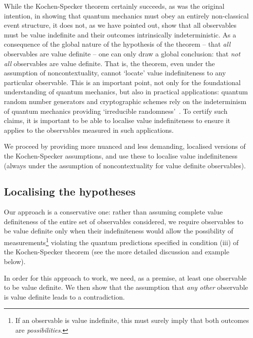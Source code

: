 \documentclass[%
 superscriptaddress,
 preprint,
 showpacs,
 showkeys,
 nofootinbib,
  amsmath,amssymb,
  aps,
  longbibliography,
  floatfix,
 ]{revtex4-1}
\theoremstyle{definition}
\begin{document}
While the Kochen-Specker theorem certainly succeeds, as was the original intention, in showing that quantum mechanics must obey an entirely non-classical event structure, it does not, as we have pointed out, show that all observables must be value indefinite and their outcomes intrinsically indeterministic.
As a consequence of the global nature of the hypothesis of the theorem -- that \emph{all} observables are value definite -- one can only draw a global conclusion: that \emph{not all} observables are value definite.
That is, the theorem, even under the assumption of noncontextuality, cannot `locate' value indefiniteness to any particular observable.
This is an important point, not only for the foundational understanding of quantum mechanics, but also in practical applications:
quantum random number generators and cryptographic schemes rely on the indeterminism of quantum mechanics providing `irreducible randomness'~\cite{Fiorentino:2007dq}.
To certify such claims, it is important to be able to localise value indefiniteness to ensure it applies to the observables measured in such applications.

We proceed by providing more nuanced and less demanding, localised versions of the Kochen-Specker assumptions, and use these to localise value indefiniteness (always under the assumption of noncontextuality for value definite observables).


\subsection{Localising the hypotheses}

Our approach is a conservative one: rather than assuming complete value definiteness of the entire set of observables considered, we require observables to be value definite only when their indefiniteness would allow the possibility of measurements\footnote{If an observable is value indefinite, this must surely imply that both outcomes are \emph{possibilities}.} violating the quantum predictions specified in condition (iii) of the Kochen-Specker theorem (see the more detailed discussion and example below).

In order for this approach to work, we need, as a premise, at least one observable to be value definite.
We then show that the assumption that \emph{any other} observable is value definite leads to a contradiction.
\end{document}
